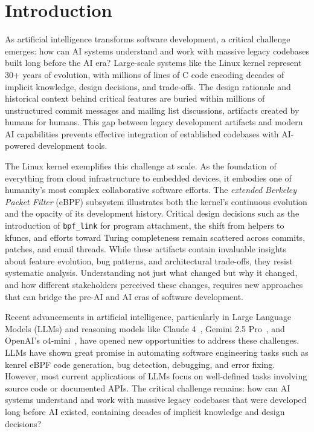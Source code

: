 \documentclass[sigconf,review,anonymous]{acmart}
\begin{document}
\maketitle

\section{Introduction}

As artificial intelligence transforms software development, a critical challenge emerges: how can AI systems understand and work with massive legacy codebases built long before the AI era? Large-scale systems like the Linux kernel represent 30+ years of evolution, with millions of lines of C code encoding decades of implicit knowledge, design decisions, and trade-offs. The design rationale and historical context behind critical features are buried within millions of unstructured commit messages and mailing list discussions, artifacts created by humans for humans. This gap between legacy development artifacts and modern AI capabilities prevents effective integration of established codebases with AI-powered development tools.

The Linux kernel exemplifies this challenge at scale. As the foundation of everything from cloud infrastructure to embedded devices, it embodies one of humanity's most complex collaborative software efforts. The \textit{extended Berkeley Packet Filter} (eBPF)\cite{ebpf} subsystem illustrates both the kernel's continuous evolution and the opacity of its development history. Critical design decisions such as the introduction of \texttt{bpf_link}\cite{bpflink} for program attachment, the shift from helpers to kfuncs\cite{kfuncs}, and efforts toward Turing completeness remain scattered across commits, patches, and email threads. While these artifacts contain invaluable insights about feature evolution, bug patterns, and architectural trade-offs, they resist systematic analysis. Understanding not just what changed but why it changed, and how different stakeholders perceived these changes, requires new approaches that can bridge the pre-AI and AI eras of software development.

Recent advancements in artificial intelligence, particularly in Large Language Models (LLMs) and reasoning models like Claude 4~\cite{claude4}, Gemini 2.5 Pro~\cite{gemini25}, and OpenAI's o4-mini~\cite{o4mini}, have opened new opportunities to address these challenges. LLMs have shown great promise in automating software engineering tasks such as kenrel eBPF code generation\cite{zheng2024kgent}, bug detection\cite{li2024enhancing}, debugging\cite{chen2023teaching}, and error fixing\cite{deligiannis2023fixing}. However, most current applications of LLMs focus on well-defined tasks involving source code or documented APIs. The critical challenge remains: how can AI systems understand and work with massive legacy codebases that were developed long before AI existed, containing decades of implicit knowledge and design decisions?
\end{document}
